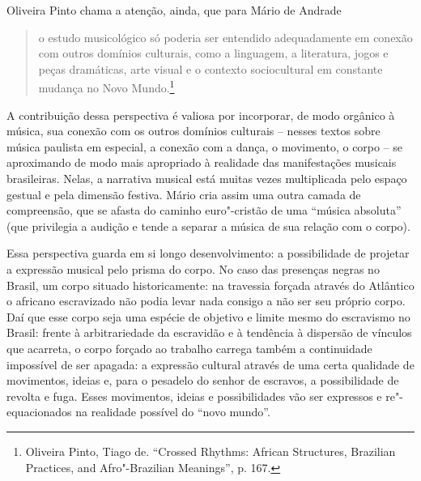 Oliveira Pinto chama a atenção, ainda, que para Mário de Andrade

\begin{quote}
o estudo musicológico só poderia ser entendido adequadamente em conexão
com outros domínios culturais, como a linguagem, a literatura, jogos e
peças dramáticas, arte visual e o contexto sociocultural em constante
mudança no Novo Mundo.\footnote{Oliveira Pinto, Tiago de. ``Crossed
  Rhythms: African Structures, Brazilian Practices, and Afro"-Brazilian
  Meanings'', p. 167.}
\end{quote}

A contribuição dessa perspectiva é valiosa por incorporar, de modo
orgânico à música, sua conexão com os outros domínios culturais --
nesses textos sobre música paulista em especial, a conexão com a dança,
o movimento, o corpo -- se aproximando de modo mais apropriado à
realidade das manifestações musicais brasileiras. Nelas, a narrativa
musical está muitas vezes multiplicada pelo espaço gestual e pela
dimensão festiva. Mário cria assim uma outra camada de compreensão, que
se afasta do caminho euro"-cristão de uma ``música absoluta'' (que
privilegia a audição e tende a separar a música de sua relação com o
corpo).

Essa perspectiva guarda em si longo desenvolvimento: a possibilidade de
projetar a expressão musical pelo prisma do corpo. No caso das presenças
negras no Brasil, um corpo situado historicamente: na travessia forçada
através do Atlântico o africano escravizado não podia levar nada consigo
a não ser seu próprio corpo. Daí que esse corpo seja uma espécie de
objetivo e limite mesmo do escravismo no Brasil: frente à arbitrariedade
da escravidão e à tendência à dispersão de vínculos que acarreta, o
corpo forçado ao trabalho carrega também a continuidade impossível de
ser apagada: a expressão cultural através de uma certa qualidade de
movimentos, ideias e, para o pesadelo do senhor de escravos, a
possibilidade de revolta e fuga. Esses movimentos, ideias e
possibilidades vão ser expressos e re"-equacionados na realidade possível
do ``novo mundo''.

